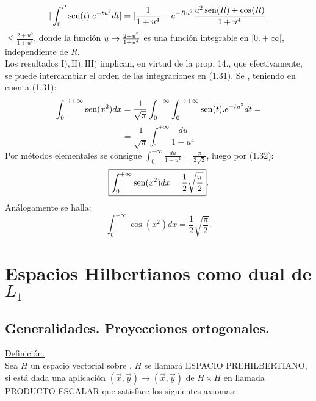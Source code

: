 \begin{equation*}
| \int_0^R \operatorname{sen} (t).e^{-tu^2}dt|=|\frac{1}{1+u^4}-e^{-Ru^2}\frac{u^2 \operatorname{sen} (R)+\cos (R)}{1+u^4}|
\end{equation*}
$ \leq \frac{2+u^2}{1+u^4}$, donde la función $u \rightarrow \frac{2+u^2}{1+u^4}$ es una función integrable en $[0.+\infty[$, independiente de $R$.\\ 
Los resultados $\mathrm{I}), \mathrm{II}),\mathrm{III})$ implican, en virtud de la prop. 14., que efectivamente, se puede intercambiar el orden de las integraciones en (1.31). Se , teniendo en cuenta (1.31):
\begin{equation}
\int_0^{\to +\infty}\operatorname{sen} (x^2)dx=\frac{1}{\sqrt{\pi}}\int_0^{+\infty}\int_0^{\to +\infty}\operatorname{sen} (t).e^{-tu^2}dt=
\end{equation}
$$
=\frac{1}{\sqrt{\pi}}\int_0^{+\infty}\frac{du}{1+u^4}
$$
Por métodos elementales se consigue $\int_0^{+\infty}\frac{du}{1+u^4}=\frac{\pi}{2\sqrt{2}}$, luego por (1.32):
\begin{equation*}
\boxed{\int_0^{+\infty}\operatorname{sen} (x^2)dx=\frac{1}{2}\sqrt{\frac{\pi}{2}}}.
\end{equation*}
Análogamente se halla:
\begin{equation*}
\boxed{\int_0^{+\infty}\cos (x^2)dx=\frac{1}{2}\sqrt{\frac{\pi}{2}}}.
\end{equation*}




\chapter{Espacios Hilbertianos \Li \phantom{} como dual de $L_1$}

\section{Generalidades. Proyecciones ortogonales.}
\underline{Definición.} \\
Sea $H$ un espacio vectorial sobre \K . $H$ se llamará ESPACIO PREHILBERTIANO, si está dada una aplicación $(\overrightarrow{x},\overrightarrow{y}) \rightarrow (\overrightarrow{x},\overrightarrow{y})$ de $H \times H$ en \K \phantom{} llamada PRODUCTO ESCALAR que satisface los siguientes axiomas:

